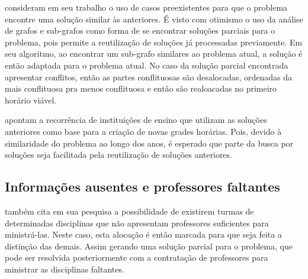  consideram em seu trabalho o uso de casos preexistentes para que o problema encontre uma solução similar às anteriores. É visto com otimismo o uso da análise de grafos e sub-grafos como forma de se encontrar soluções parciais para o problema, pois permite a reutilização de soluções já processadas previamente. Em seu algoritmo, ao encontrar um sub-grafo similares ao problema atual, a solução é então adaptada para o problema atual. No caso da solução parcial encontrada apresentar conflitos, então as partes conflituosas são desalocadas, ordenadas da mais conflituosa pra menos conflituosa e então são realoacadas no primeiro horário viável.

 apontam a recorrência de instituições de ensino que utilizam as soluções anteriores como base para a criação de novas grades horárias. Pois, devido à similaridade do problema ao longo dos anos, é esperado que parte da busca por soluções seja facilitada pela reutilização de soluções anteriores.

\subsection{Informações ausentes e professores faltantes}

 também cita em sua pesquisa a possibilidade de existirem turmas de determinadas disciplinas que não apresentam professores suficientes para ministrá-las. Neste caso, esta alocação é então marcada para que seja feita a distinção das demais. Assim gerando uma solução parcial para o problema, que pode ser resolvida posteriormente com a contratação de professores para ministrar as disciplinas faltantes.
